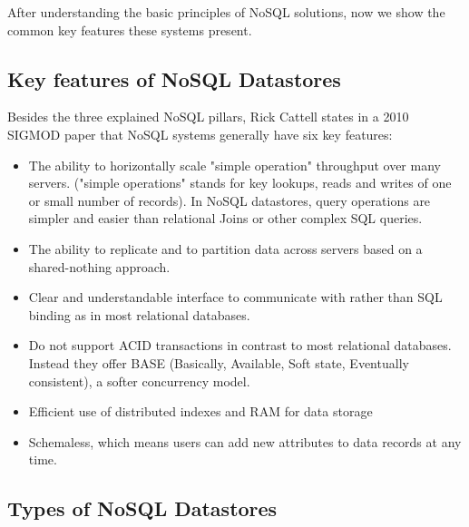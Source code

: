 After understanding the basic principles of NoSQL solutions, now we show the common key features these systems present.

\subsection{Key features of NoSQL Datastores}

Besides the three explained NoSQL pillars, Rick Cattell states in a 2010 SIGMOD paper \cite{cattell2011scalable} that NoSQL systems generally have six key features:
\begin{itemize}
\item The ability to horizontally scale "simple operation" throughput over many servers. ("simple operations" stands for key lookups, reads and writes of one or small number of records). In NoSQL datastores, query operations are simpler and easier than relational Joins or other complex SQL queries.

\item The ability to replicate and to partition data across servers based on a shared-nothing approach.

\item Clear and understandable interface to communicate with rather than SQL binding as in most relational databases.

\item Do not support ACID transactions in contrast to most relational databases. Instead they offer BASE (Basically, Available, Soft state, Eventually consistent), a softer concurrency model.

\item Efficient use of distributed indexes and RAM for data storage

\item Schemaless, which means users can add new attributes to data records at any time.

\end{itemize}


\subsection{Types of NoSQL Datastores}

